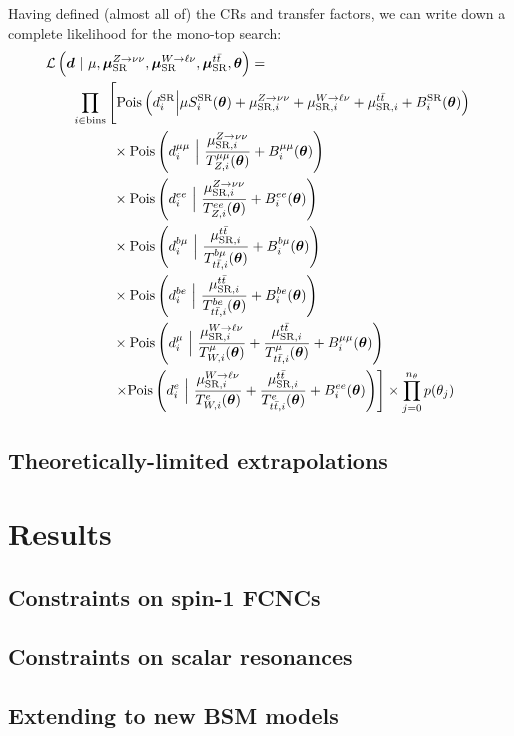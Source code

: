 Having defined (almost all of) the CRs and transfer factors, we can write down a complete likelihood for the mono-top search:
\begin{align}
    \mathcal{L}\left(\bm{d}~|~ \mu,\muz,\muw,\mut,\bm{\theta}\right) = \hspace{-40mm} & \nonumber \\
    \prod_{i\in\mathrm{bins}} & \left[ 
    \pois\left(d^{\mathrm{SR}}_{i} \Big| \mu S^{\mathrm{SR}}_{i}(\bm\theta)  + \muzi + \muwi + \muti + B^{\mathrm{SR}}_{i}(\bm\theta)\right) \vphantom{\frac{\muzi}{\Ti{\mu\mu}{Z}(\bm\theta)}}\right. \nonumber \\
    & \phantom{\Big[} \times \pois\left(d^{\mu\mu}_i~\Big|~ \frac{\muzi}{\Ti{\mu\mu}{Z}(\bm\theta)} + B^{\mu\mu}_i(\bm\theta) \right) \nonumber \\  
    & \phantom{\Big[} \times \pois\left(d^{ee}_i~\Big|~ \frac{\muzi}{\Ti{ee}{Z}(\bm\theta)} + B^{ee}_i(\bm\theta) \right) \nonumber \\ 
    & \phantom{\Big[} \times \pois\left(d^{b\mu}_i~\Big|~ \frac{\muti}{\Ti{b\mu}{\ttbar}(\bm\theta)} + B^{b\mu}_i(\bm\theta) \right) \nonumber \\ 
    & \phantom{\Big[} \times \pois\left(d^{be}_i~\Big|~ \frac{\muti}{\Ti{be}{\ttbar}(\bm\theta)} + B^{be}_i(\bm\theta) \right) \nonumber \\  
    & \phantom{\Big[} \times \pois\left(d^{\mu}_i~\Big|~ \frac{\muwi}{\Ti{\mu}{W}(\bm\theta)} + \frac{\muti}{\Ti{\mu}{\ttbar}(\bm\theta)}+ B^{\mu\mu}_i(\bm\theta) \right)  \nonumber \\
    & \phantom{\Big[} \left. \times \pois\left(d^{e}_i~\Big|~ \frac{\muwi}{\Ti{e}{W}(\bm\theta)} + \frac{\muti}{\Ti{e}{\ttbar}(\bm\theta)} + B^{ee}_i(\bm\theta) \right) \right]  \times  \prod_{j=0}^{n_\theta} p(\theta_j)
\end{align}

\subsection{Theoretically-limited extrapolations}
\label{sec:mt:smtheory}

\section{Results}

\subsection{Constraints on spin-1 FCNCs}

\subsection{Constraints on scalar resonances}

\subsection{Extending to new BSM models}
